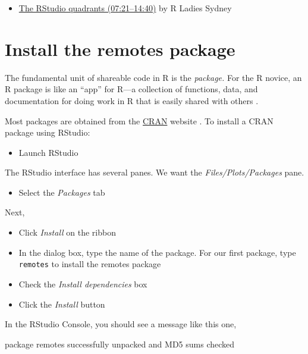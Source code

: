 \documentclass[
]{book}
\newenvironment{Shaded}{\begin{snugshade}}{\end{snugshade}}
\newcommand{\NormalTok}[1]{#1}
\newcommand{\StringTok}[1]{\textcolor[rgb]{0.31,0.60,0.02}{#1}}
\providecommand{\tightlist}{%
  \setlength{\itemsep}{0pt}\setlength{\parskip}{0pt}}
\begin{document}
\begin{itemize}
\tightlist
\item
  \href{https://www.youtube.com/embed/kfcX5DEMAp4?start=441\&end=880}{The RStudio quadrants (07:21--14:40)} by R Ladies Sydney \citep{RLadiesSydney:2018:Lesson1}
\end{itemize}

\hypertarget{install-the-remotes-package}{%
\section*{Install the remotes package}\label{install-the-remotes-package}}

The fundamental unit of shareable code in R is the \emph{package.} For the R novice, an R package is like an ``app'' for R---a collection of functions, data, and documentation for doing work in R that is easily shared with others \citep{wickham2014advanced}.

Most packages are obtained from the \href{https://cran.r-project.org/}{CRAN} website \citep{cranweb}. To install a CRAN package using RStudio:

\begin{itemize}
\tightlist
\item
  Launch RStudio
\end{itemize}

The RStudio interface has several panes. We want the \emph{Files/Plots/Packages} pane.

\begin{itemize}
\tightlist
\item
  Select the \emph{Packages} tab
\end{itemize}

Next,

\begin{itemize}
\tightlist
\item
  Click \emph{Install} on the ribbon
\item
  In the dialog box, type the name of the package. For our first package, type \texttt{remotes} to install the remotes package \citep{R-remotes}
\item
  Check the \emph{Install dependencies} box
\item
  Click the \emph{Install} button
\end{itemize}

In the RStudio Console, you should see a message like this one,

\begin{Shaded}
\begin{Highlighting}[]
\NormalTok{    package }\StringTok{\textquotesingle{}remotes\textquotesingle{}}\NormalTok{ successfully unpacked and MD5 sums checked}
\end{Highlighting}
\end{Shaded}
\end{document}
